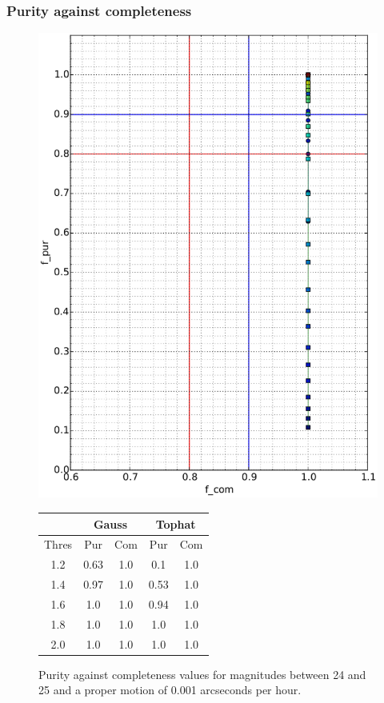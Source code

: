 \documentclass{article}
\begin{document}
\subsubsection{Purity against completeness}
\begin{figure}[H]
\centering
\includegraphics[width=.7\linewidth]{images/24_25_0_f.eps}
\qquad
\begin{tabular}[b]{|c|c|c|c|c|}\hline
\multicolumn{1}{|c|}{} & \multicolumn{2}{c|}{Gauss} & \multicolumn{2}{c|}{Tophat} \\
\hline \hline
Thres & Pur & Com & Pur & Com\\
\hline
1.2 & 0.63 & 1.0 & 0.1 & 1.0\\
\hline
1.4 & 0.97 & 1.0 & 0.53 & 1.0\\
\hline
1.6 & 1.0 & 1.0 & 0.94 & 1.0\\
\hline
1.8 & 1.0 & 1.0 & 1.0 & 1.0\\
\hline
2.0 & 1.0 & 1.0 & 1.0 & 1.0\\
\hline
\end{tabular}
\captionsetup{labelformat=andtable}
\caption{Purity against completeness values for magnitudes between 24 and 25 and a proper motion of 0.001 arcseconds per hour.}
\end{figure}
\end{document}
